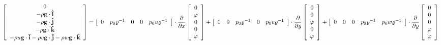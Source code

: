 \documentclass{article}
\begin{document}
\begin{equation} \left[\begin{array}{c} 0 \\ -\rho {\bf g}\cdot{\bf \hat{i}} \\ -\rho {\bf g}\cdot{\bf \hat{j}} \\ -\rho {\bf g}\cdot{\bf \hat{k}} \\ -\rho u {\bf g}\cdot{\bf \hat{i}} - \rho v {\bf g}\cdot{\bf \hat{j}} - \rho w {\bf g}\cdot{\bf \hat{k}} \end{array}\right] = \left[\begin{array}{ccccc} 0 & p_0 \varrho^{-1} & 0 & 0 & p_0 u \varrho^{-1} \end{array}\right] \cdot \frac{\partial}{\partial x}\left[\begin{array}{c} 0 \\ \varphi \\ 0 \\ 0 \\ \varphi \end{array}\right] + \left[\begin{array}{ccccc} 0 & 0 & p_0 \varrho^{-1} & 0 & p_0 v \varrho^{-1} \end{array}\right] \cdot \frac{\partial}{\partial y}\left[\begin{array}{c} 0 \\ 0 \\ \varphi \\ 0 \\ \varphi \end{array}\right] + \left[\begin{array}{ccccc} 0 & 0 & 0 & p_0 \varrho^{-1} & p_0 w \varrho^{-1} \end{array}\right] \cdot \frac{\partial}{\partial y}\left[\begin{array}{c} 0 \\ 0 \\ 0 \\ \varphi \\ \varphi \end{array}\right] \end{equation}
\pagebreak
\end{document}
